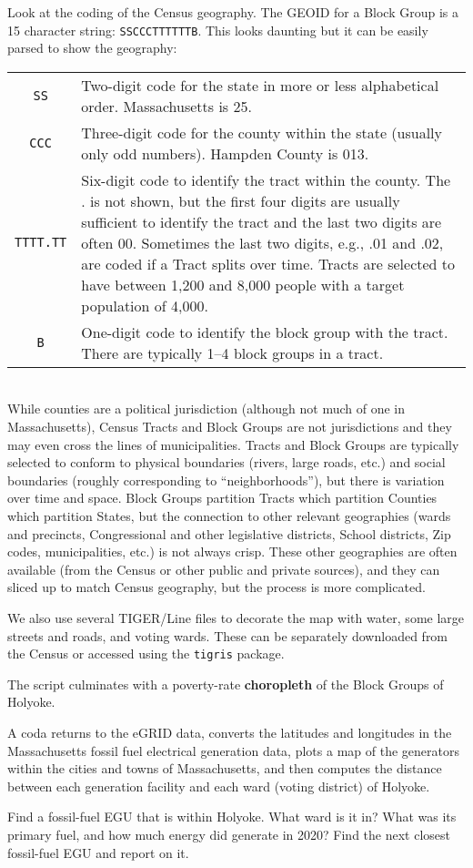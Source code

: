 \documentclass[fleqn, 12pt]{exam}
\begin{document}
\begin{questions}
  \question Look at the coding of the Census geography. The GEOID for a Block Group is a 15 character string:  \texttt{SSCCCTTTTTTB}. This looks daunting but it can be easily parsed to show the geography:\\
    \begin{tabular}{cp{}}
      \texttt{SS}  & Two-digit code for the state in more or less alphabetical order. Massachusetts is 25. \\
      \texttt{CCC} & Three-digit code for the county within the state (usually only odd numbers).  Hampden County is 013. \\
      \texttt{TTTT.TT} & Six-digit code to identify the tract within the county.  The . is not shown, but the first four digits are usually sufficient to identify the tract and the last two digits are often 00. Sometimes the last two digits, e.g., .01 and .02, are coded if a Tract splits over time. Tracts are selected to have between 1,200 and 8,000 people with a target population of 4,000.\\
      \texttt{B} & One-digit code to identify the block group with the tract. There are typically 1--4 block groups in a tract.
    \end{tabular}\\
    While counties are a political jurisdiction (although not much of one in Massachusetts), Census Tracts and Block Groups are not jurisdictions and they may even cross the lines of municipalities.  Tracts and Block Groups are typically selected to conform to physical boundaries (rivers, large roads, etc.) and social boundaries (roughly corresponding to ``neighborhoods''), but there is variation over time and space.  Block Groups partition Tracts which partition Counties which partition States, but the connection to other relevant geographies (wards and precincts, Congressional and other legislative districts, School districts, Zip codes, municipalities, etc.) is not always crisp.  These other geographies are often available (from the Census or other public and private sources), and they can sliced up to match Census geography, but the process is more complicated.
    
  \question We also use several TIGER/Line files to decorate the map with water, some large streets and roads, and voting wards.  These can be separately downloaded from the Census or accessed using the \texttt{tigris} package.

  \question The script culminates with a poverty-rate \textbf{choropleth} of the Block Groups of Holyoke.
    
  \question A coda returns to the eGRID data, converts the latitudes and longitudes in the Massachusetts fossil fuel electrical generation data, plots a map of the generators within the cities and towns of Massachusetts, and then computes the distance between each generation facility and each ward (voting district) of Holyoke. 

  \question Find a fossil-fuel EGU that is within Holyoke.  What ward is it in? What was its primary fuel, and how much energy did generate in 2020?  Find the next closest fossil-fuel EGU and report on it.


\end{questions}
\end{document}
